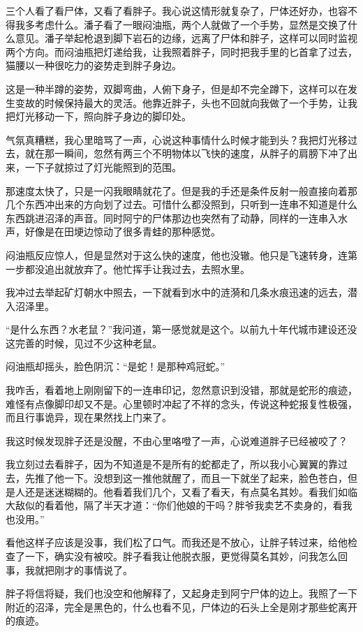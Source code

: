 三个人看了看尸体，又看了看胖子。我心说这情形就复杂了，尸体还好办，也容不得我多考虑什么。潘子看了一眼闷油瓶，两个人就做了一个手势，显然是交换了什么意见。潘子举起枪退到脚下岩石的边缘，远离了尸体和胖子，这样可以同时监视两个方向。而闷油瓶把灯递给我，让我照着胖子，同时把我手里的匕首拿了过去，猫腰以一种很吃力的姿势走到胖子身边。

这是一种半蹲的姿势，双脚弯曲，人俯下身子，但是却不完全蹲下，这样可以在发生变故的时候保持最大的灵活。他靠近胖子，头也不回就向我做了一个手势，让我把灯光移动一下，照向胖子身边的脚印处。

气氛真糟糕，我心里暗骂了一声，心说这种事情什么时候才能到头？我把灯光移过去，就在那一瞬间，忽然有两三个不明物体以飞快的速度，从胖子的肩膀下冲了出来，一下子就掠过了灯光能照到的范围。

那速度太快了，只是一闪我眼睛就花了。但是我的手还是条件反射一般直接向着那几个东西冲出来的方向划了过去。可惜什么都没照到，只听到一连串不知道是什么东西跳进沼泽的声音。同时阿宁的尸体那边也突然有了动静，同样的一连串入水声，好像是在田埂边惊动了很多青蛙的那种感觉。

闷油瓶反应惊人，但是显然对于这么快的速度，他也没辙。他只是飞速转身，连第一步都没追出就放弃了。他忙挥手让我过去，去照水里。

我冲过去举起矿灯朝水中照去，一下就看到水中的涟漪和几条水痕迅速的远去，潜入沼泽里。

“是什么东西？水老鼠？”我问道，第一感觉就是这个。以前九十年代城市建设还没这完善的时候，见过不少这种老鼠。

闷油瓶却摇头，脸色阴沉：“是蛇！是那种鸡冠蛇。”

我咋舌，看着地上刚刚留下的一连串印记，忽然意识到没错，那就是蛇形的痕迹，难怪有点像脚印却又不是。心里顿时冲起了不祥的念头，传说这种蛇报复性极强，而且行事诡异，现在果然找上门来了。

我这时候发现胖子还是没醒，不由心里咯噔了一声，心说难道胖子已经被咬了？

我立刻过去看胖子，因为不知道是不是所有的蛇都走了，所以我小心翼翼的靠过去，先推了他一下。没想到这一推他就醒了，而且一下就坐了起来，脸色苍白，但是人还是迷迷糊糊的。他看着我们几个，又看了看天，有点莫名其妙。看我们如临大敌似的看着他，隔了半天才道：“你们他娘的干吗？胖爷我卖艺不卖身的，看我也没用。”

看他这样子应该是没事，我们松了口气。而我还是不放心，让胖子转过来，给他检查了一下，确实没有被咬。胖子看我让他脱衣服，更觉得莫名其妙，问我怎么回事，我就把刚才的事情说了。

胖子将信将疑，我们也没空和他解释了，又起身走到阿宁尸体的边上。我照了一下附近的沼泽，完全是黑色的，什么也看不见，尸体边的石头上全是刚才那些蛇离开的痕迹。

